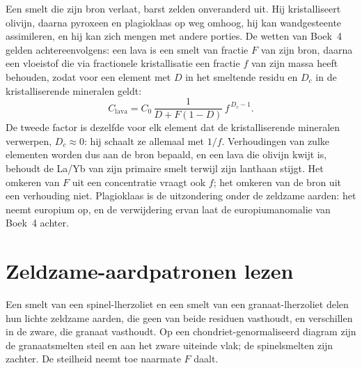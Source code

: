 Een smelt die zijn bron verlaat, barst zelden onveranderd uit. Hij kristalliseert
olivijn, daarna pyroxeen en plagioklaas op weg omhoog, hij kan wandgesteente assimileren,
en hij kan zich mengen met andere porties. De wetten van Boek~4 gelden achtereenvolgens:
een lava is een smelt van fractie $F$ van zijn bron, daarna een vloeistof die
via fractionele kristallisatie een fractie $f$ van zijn massa heeft behouden, zodat
voor een element met $D$ in het smeltende residu en $D_c$ in de kristalliserende
mineralen geldt:
\[
C_{\text{lava}} = C_0\,\frac{1}{D + F(1 - D)}\,f^{\,D_c - 1}.
\]
De tweede factor is dezelfde voor elk element dat de kristalliserende
mineralen verwerpen, $D_c \approx 0$: hij schaalt ze allemaal met $1/f$. Verhoudingen van zulke
elementen worden dus aan de bron bepaald, en een lava die olivijn kwijt is,
behoudt de La/Yb van zijn primaire smelt terwijl zijn lanthaan stijgt. Het omkeren van $F$
uit een concentratie vraagt ook $f$; het omkeren van de bron uit een verhouding niet.
Plagioklaas is de uitzondering onder de zeldzame aarden: het neemt europium op,
en de verwijdering ervan laat de europiumanomalie van Boek~4 achter.

\section{Zeldzame-aardpatronen lezen}\label{sec:b3:trace-element-modelling:patterns}

Een smelt van een spinel-lherzoliet en een smelt van een granaat-lherzoliet delen hun
lichte zeldzame aarden, die geen van beide residuen vasthoudt, en verschillen in de zware,
die granaat vasthoudt. Op een chondriet-genormaliseerd diagram zijn de granaatsmelten
steil en aan het zware uiteinde vlak; de spinelsmelten zijn zachter. De
steilheid neemt toe naarmate $F$ daalt.

